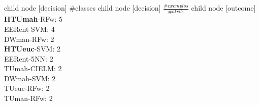 child {node [decision] {\#classes}
child {node [decision] {$\frac{\#exemplos}{\#atrib.}$}
child {node [outcome] {
\textbf{HTUmah}-RFw: 5\\
EERent-SVM: 4\\
DWman-RFw: 2\\
\textbf{HTUeuc}-SVM: 2\\
EERent-5NN: 2\\
TUmah-CIELM: 2\\
DWmah-SVM: 2\\
TUeuc-RFw: 2\\
TUman-RFw: 2\\
}}}}
